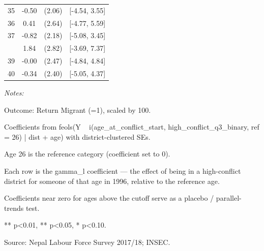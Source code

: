 \begin{table}[!h]
\begin{threeparttable}
\begin{tabular}[t]{cccc}
35 & -0.50 & (2.06) & {}[-4.54, 3.55]\\
36 & 0.41 & (2.64) & {}[-4.77, 5.59]\\
37 & -0.82 & (2.18) & {}[-5.08, 3.45]\\
\addlinespace
38 & 1.84 & (2.82) & {}[-3.69, 7.37]\\
39 & -0.00 & (2.47) & {}[-4.84, 4.84]\\
40 & -0.34 & (2.40) & {}[-5.05, 4.37]\\
\bottomrule
\end{tabular}
\begin{tablenotes}
\item \textit{Notes:} 
\item Outcome: Return Migrant (=1), scaled by 100.
\item Coefficients from feols(Y ~ i(age_at_conflict_start, high_conflict_q3_binary, ref = 26) | dist + age) with district-clustered SEs.
\item Age 26 is the reference category (coefficient set to 0).
\item Each row is the gamma_l coefficient — the effect of being in a high-conflict district for someone of that age in 1996, relative to the reference age.
\item Coefficients near zero for ages above the cutoff serve as a placebo / parallel-trends test.
\item *** p<0.01, ** p<0.05, * p<0.10.
\item Source: Nepal Labour Force Survey 2017/18; INSEC.
\end{tablenotes}
\end{threeparttable}
\end{table}
